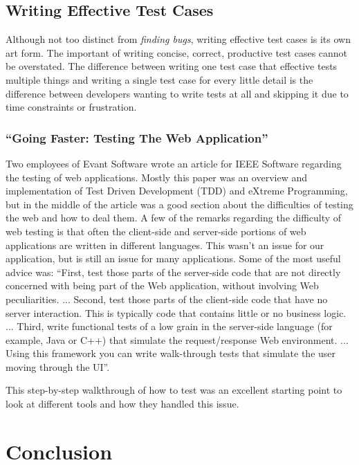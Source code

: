 \documentclass[11pt]{article}
\begin{document}

\subsection{Writing Effective Test Cases}
Although not too distinct from \emph{finding bugs}, writing effective test cases is its own art form. The important of writing concise, correct, productive test cases cannot be overstated. The difference between writing one test case that effective tests multiple things and writing a single test case for every little detail is the difference between developers wanting to write tests at all and skipping it due to time constraints or frustration.

\subsubsection{``Going Faster: Testing The Web Application'' \cite{GoingFaster}}
Two employees of Evant Software wrote an article for IEEE Software regarding the testing of web applications. Mostly this paper was an overview and implementation of Test Driven Development (TDD) and eXtreme Programming, but in the middle of the article was a good section about the difficulties of testing the web and how to deal them. A few of the remarks regarding the difficulty of web testing is that often the client-side and server-side portions of web applications are written in different languages. This wasn't an issue for our application, but is still an issue for many applications. Some of the most useful advice was: ``First, test those parts of the server-side code that are not directly concerned with being part of the Web application, without involving Web peculiarities. ... Second, test those parts of the client-side code that have no server interaction. This is typically code that contains little or no business logic. ... Third, write functional tests of a low grain in the server-side language (for example, Java or C++) that simulate the request/response Web environment. ... Using this framework you can write walk-through tests that simulate the user moving through the UI''.

This step-by-step walkthrough of how to test was an excellent starting point to look at different tools and how they handled this issue.

\section{Conclusion}
\end{document}
